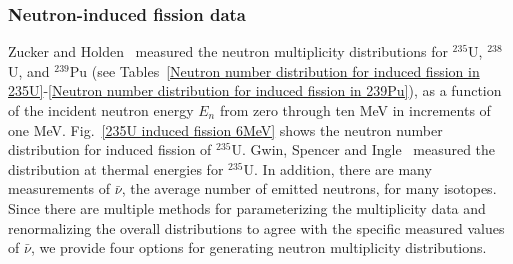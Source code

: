 \documentclass[11pt]{article}
\newcommand{\notgeant}[1]{}%
\begin{document}
\subsubsection*{Neutron-induced fission data}

Zucker and Holden~\cite{Zucker and Holden 1986} measured the neutron
multiplicity distributions for $^{235}$U, $^{238}$U, and $^{239}$Pu
(see Tables~\ref{Neutron number distribution for induced fission in
235U}-\ref{Neutron number distribution for induced fission in 239Pu}),
as a function of the incident neutron energy $E_n$ from 
zero through ten MeV in increments of one MeV.  Fig.~\ref{235U induced
fission 6MeV} shows the neutron number distribution for induced
fission of $^{235}$U. Gwin, Spencer and Ingle~\cite{Gwin 1984}
measured the distribution at thermal energies for $^{235}$U. In
addition, there are many measurements of $\bar{\nu}$, the average
number of emitted neutrons, for many isotopes. Since there are multiple
methods for parameterizing the multiplicity data and 
renormalizing the overall distributions to agree with the specific measured
values of $\bar{\nu}$, we provide four options for generating 
neutron multiplicity distributions. 
\notgeant{These options are selected by the internal variable {\tt nudist}, default=3.}
\end{document}

